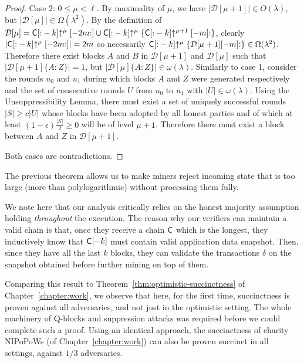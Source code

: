 \begin{proof}
	Case 2: $0 \leq \mu < \ell$. By maximality of $\mu$, we have
	$|\mathcal{D}[\mu + 1]| \in O(\lambda)$, but
	$|\mathcal{D}[\mu]| \in \Omega(\lambda^2)$.
	By the definition of
	$\mathcal{D}[\mu] = \mathsf{C}[{:}-k]\negthickspace\uparrow^\mu[-2m{:}] \cup
	\mathsf{C}[{:}-k]\negthickspace\uparrow^\mu\{\mathsf{C}[{:}-k]\negthickspace\uparrow^{\mu+1}[-m]{:}\}$, clearly
	$|\mathsf{C}[{:}-k]\negthickspace\uparrow^\mu[-2m{:}]| = 2m$ so necessarily
	$\mathsf{C}[{:}-k]\negthickspace\uparrow^\mu\{\mathcal{D}[\mu+1][-m]{:}\} \in \Omega(\lambda^2)$. Therefore there exist blocks $A$ and $B$
	in $\mathcal{D}[\mu+1]$ and $\mathcal{D}[\mu]$ such that
	$|\mathcal{D}[\mu + 1]\{A{:}Z\}| = 1$, but
	$|\mathcal{D}[\mu]\{A{:}Z\}| \in \omega(\lambda)$. Similarly to case
	1, consider the rounds $u_0$ and $u_1$ during which blocks $A$ and $Z$ were
	generated respectively and the set of consecutive rounds $U$ from $u_0$ to
	$u_1$ with $|U| \in \omega(\lambda)$. Using the Unsuppressibility Lemma, there
	must exist a set of uniquely successful rounds $|S| \geq c|U|$ whose blocks
	have been adopted by all honest parties and of which at
	least $(1 - \epsilon)\frac{|S|}{2} \geq 0$ will be of level $\mu + 1$.
	Therefore there must exist a block between $A$ and $Z$ in
	$\mathcal{D}[\mu + 1]$.

	Both cases are contradictions.
\end{proof}

The previous theorem allows us to make miners reject incoming state that is too
large (more than polylogarithmic) without processing them fully.

We note here that our analysis critically relies on the honest majority
assumption holding \emph{throughout} the execution. The reason why
our verifiers can maintain a valid chain is that, once
they receive a chain $\mathsf{C}$ which is the longest, they inductively know that
$\mathsf{C}[-k]$ must contain valid application data snapshot. Then, since they have all the last
$k$ blocks, they can validate the transactions $\delta$ on the
snapshot obtained before further mining on top of them.

Comparing this result to Theorem~\ref{thm:optimistic-succinctness} of Chapter~\ref{chapter:work},
we observe that here, for the first time, succinctness is proven against all adversaries,
and not just in the optimistic setting. The whole machinery of Q-blocks and suppression
attacks was required before we could complete such a proof. Using an identical approach,
the succinctness of charity NIPoPoWs (of Chapter~\ref{chapter:work}) can also be proven
succinct in all settings, against $1/3$ adversaries.
